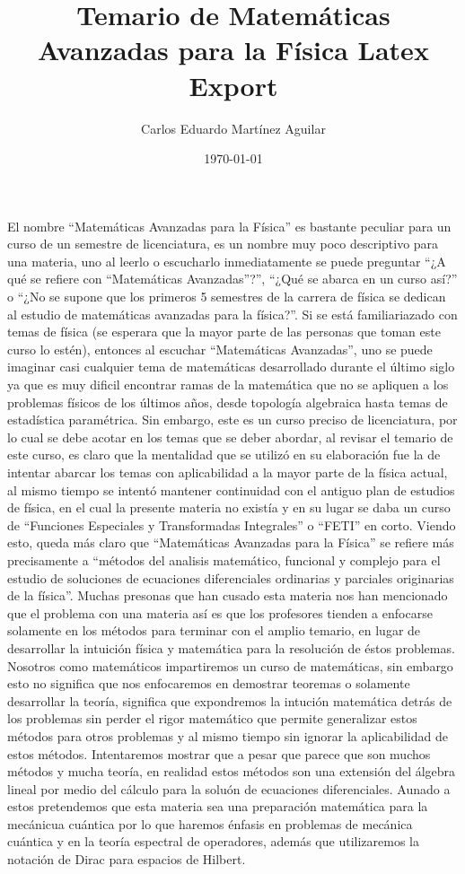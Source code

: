 \documentclass[letterpaper]{article}
\author{Carlos Eduardo Martínez Aguilar}
\date{\today}
\title{Temario de Matemáticas Avanzadas para la Física Latex Export}
\begin{document}
\maketitle

\noindent El nombre ``Matemáticas Avanzadas para la Física'' es bastante peculiar para un curso de un semestre de licenciatura, es un nombre muy poco descriptivo para una materia, uno al leerlo o escucharlo inmediatamente se puede preguntar ``¿A qué se refiere con ``Matemáticas Avanzadas''?'', ``¿Qué se abarca en un curso así?'' o ``¿No se supone que los primeros 5 semestres de la carrera de física se dedican al estudio de matemáticas avanzadas para la física?''. Si se está familiariazado con temas de física (se esperara que la mayor parte de las personas que toman este curso lo estén), entonces al escuchar ``Matemáticas Avanzadas'', uno se puede imaginar casi cualquier tema de matemáticas desarrollado durante el último siglo ya que es muy dificil encontrar ramas de la matemática que no se apliquen a los problemas físicos de los últimos años, desde topología algebraica hasta temas de estadística paramétrica.
Sin embargo, este es un curso preciso de licenciatura, por lo cual se debe acotar en los temas que se deber abordar, al revisar el temario de este curso, es claro que la mentalidad que se utilizó en su elaboración fue la de intentar abarcar los temas con aplicabilidad a la mayor parte de la física actual, al mismo tiempo se intentó mantener continuidad con el antiguo plan de estudios de física, en el cual la presente materia no existía y en su lugar se daba un curso de ``Funciones Especiales y Transformadas Integrales'' o ``FETI'' en corto. Viendo esto, queda más claro que ``Matemáticas Avanzadas para la Física'' se refiere más precisamente a ``métodos del analisis matemático, funcional y complejo para el estudio de soluciones de ecuaciones diferenciales ordinarias y parciales originarias de la física''.
Muchas presonas que han cusado esta materia nos han mencionado que el problema con una materia así es que los profesores tienden a enfocarse solamente en los métodos para terminar con el amplio temario, en lugar de desarrollar la intuición física y matemática para la resolución de éstos problemas. Nosotros como matemáticos impartiremos un curso de matemáticas, sin embargo esto no significa que nos enfocaremos en demostrar teoremas o solamente desarrollar la teoría, significa que expondremos la intución matemática detrás de los problemas sin perder el rigor matemático que permite generalizar estos métodos para otros problemas y al mismo tiempo sin ignorar la aplicabilidad de estos métodos. Intentaremos mostrar que a pesar que parece que son muchos métodos y mucha teoría, en realidad estos métodos son una extensión del álgebra lineal por medio del cálculo para la soluón de ecuaciones diferenciales. Aunado a estos pretendemos que esta materia sea una preparación matemática para la mecánicua cuántica por lo que haremos énfasis en problemas de mecánica cuántica y en la teoría espectral de operadores, además que utilizaremos la notación de Dirac  para espacios de Hilbert.\\
\vspace{1cm}
\end{document}
